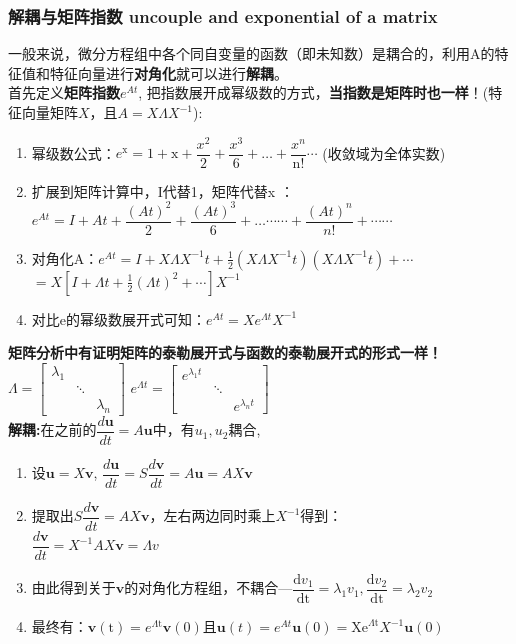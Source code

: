     \subsubsection{解耦与矩阵指数 uncouple and exponential of a matrix}
    一般来说，微分方程组中各个同自变量的函数（即未知数）是耦合的，利用A的特征值和特征向量进行\textbf{对角化}就可以进行\textbf{解耦}。
    \\
    首先定义\textbf{矩阵指数$e^{A t}$}, 把指数展开成幂级数的方式，\textbf{当指数是矩阵时也一样}！(特征向量矩阵$X$，且$A=X\Lambda X^{-1}$):
    \begin{enumerate}
        \item 幂级数公式：$e^{\mathrm{x}}=1+\mathrm{x}+\dfrac{x^{2}}{2}+\dfrac{x^{3}}{6}+ \dots +\dfrac{x^{n}}{\mathrm{n} !}\cdots$ \quad (收敛域为全体实数)
        \item 扩展到矩阵计算中，I代替1，矩阵代替x ：\\
        $e^{A t}=I+A t+\dfrac{(A t)^{2}}{2}+\dfrac{(A t)^{3}}{6}+\dots \cdots \cdots+\dfrac{(A t)^{n}}{n !}+\cdots \cdots$
        \item 对角化A：$e^{A t}=I+X \Lambda X^{-1} t+\frac{1}{2}\left(X \Lambda X^{-1} t\right)\left(X \Lambda X^{-1} t\right)+\cdots$\\
        $=X\left[I+\Lambda t+\frac{1}{2}(\Lambda t)^{2}+\cdots\right] X^{-1}$
        \item 对比e的幂级数展开式可知：$e^{A t}=X e^{\Lambda t} X^{-1}$
    \end{enumerate}
    \textbf{矩阵分析中有证明矩阵的泰勒展开式与函数的泰勒展开式的形式一样！}\\
    $\Lambda=\left[\begin{array}{ccc}{\lambda_{1}} & {} & {} \\ {} & {\ddots} & {} \\ {} & {} & {\lambda_{n}}\end{array}\right]$ \quad
    $e^{\Lambda t} = \left[\begin{array}{ccc}{e^{\lambda_{1} t}} & {} & {} \\ {} & {\ddots} & {} \\ {} & {} & {e^{\lambda_{n} t}}\end{array}\right]$
    \\
    \textbf{解耦:}在之前的$\dfrac{d\bm{u}}{dt}=A\bm{u}$中，有$u_1, u_2$耦合,
    \begin{enumerate}
        \item 设$\bm{u}=X\bm{v}$, $\dfrac{{d} \bm{u}}{dt}={S} \dfrac{{d} \bm{v}}{{dt}}=A\bm{u}=AX\bm{v}$
        \item 提取出${S} \dfrac{{d} \bm{v}}{{dt}}=AX\bm{v}$，左右两边同时乘上$X^{-1}$得到：\\
        $\dfrac{{d} \bm{v}}{{dt}}=X^{-1}AX\bm{v} = \Lambda v$
        \item 由此得到关于$\bm{v}$的对角化方程组，不耦合---$\dfrac{\mathrm{d} v_{1}}{\mathrm{dt}}=\lambda_{1} v_{1}, \dfrac{\mathrm{d} v_{2}}{\mathrm{dt}}=\lambda_{2} v_{2}$
        \item 最终有：$\bm{v}(\mathrm{t})=e^{\Lambda \mathrm{t}} \bm{v}(0)$且$\bm{u}(t)=e^{A t} \bm{u}(0)=\mathrm{Xe}^{\Lambda \mathrm{t}} X^{-1} \bm{u}(0)$
    \end{enumerate}
